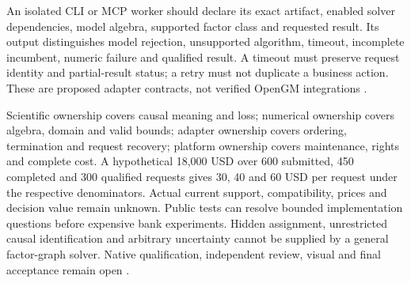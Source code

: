 An isolated CLI or MCP worker should declare its exact artifact, enabled
solver dependencies, model algebra, supported factor class and requested
result. Its output distinguishes model rejection, unsupported algorithm,
timeout, incomplete incumbent, numeric failure and qualified result. A
timeout must preserve request identity and partial-result status; a retry
must not duplicate a business action. These are proposed adapter contracts,
not verified OpenGM integrations \cite{exec24_opengm_choice}.

Scientific ownership covers causal meaning and loss; numerical ownership
covers algebra, domain and valid bounds; adapter ownership covers ordering,
termination and request recovery; platform ownership covers maintenance,
rights and complete cost. A hypothetical 18,000 USD over 600 submitted,
450 completed and 300 qualified requests gives 30, 40 and 60 USD per request
under the respective denominators. Actual current support, compatibility,
prices and decision value remain unknown. Public tests can resolve bounded
implementation questions before expensive bank experiments. Hidden
assignment, unrestricted causal identification and arbitrary uncertainty
cannot be supplied by a general factor-graph solver. Native qualification,
independent review, visual and final acceptance remain open
\cite{exec24_opengm_choice}.
